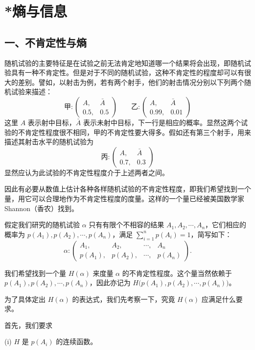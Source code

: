 \documentclass[../../main.tex]{subfiles}
\begin{document}
\section{*熵与信息}\label{section:ch04-熵与信息}

\subsection*{一、不肯定性与熵}

随机试验的主要特征是在试验之前无法肯定地知道哪一个结果将会出现，即随机试验具有一种不肯定性。但是对于不同的随机试验，这种不肯定性的程度却可以有很大的差别。譬如，以射击为例，若有两个射手，他们的射击情况分别以下列两个随机试验来描述：
\[
\text{甲}:\begin{pmatrix}A,&\bar{A}\\0.5,&0.5\end{pmatrix}
\qquad
\text{乙}:\begin{pmatrix}A,&\bar{A}\\0.99,&0.01\end{pmatrix}
\]
这里 $A$ 表示射中目标，$\bar{A}$ 表示未射中目标，下一行是相应的概率。显然这两个试验的不肯定性程度很不相同，甲的不肯定性要大得多。假如还有第三个射手，用来描述其射击水平的随机试验为
\[
\text{丙}:\begin{pmatrix}A,&\bar{A}\\0.7,&0.3\end{pmatrix}
\]
显然应认为此试验的不肯定性程度介于上述两者之间。

因此有必要从数值上估计各种各样随机试验的不肯定性程度，即我们希望找到一个量，用它可以合理地作为不肯定性程度的度量。这样的一个量已经被美国数学家 Shannon（香农）找到。

假定我们研究的随机试验 $\alpha$ 只有有限个不相容的结果 $A_1,A_2,\cdots,A_n$，它们相应的概率为 $p(A_1),p(A_2),\cdots,p(A_n)$，满足 $\sum_{i=1}^n p(A_i)=1$，简写如下：
\[
\alpha:\begin{pmatrix}A_1,&A_2,&\cdots,&A_n\\p(A_1),&p(A_2),&\cdots,&p(A_n)\end{pmatrix}.
\]

我们希望找到一个量 $H(\alpha)$ 来度量 $\alpha$ 的不肯定性程度。这个量当然依赖于 $p(A_1),p(A_2),\cdots,p(A_n)$，因此亦记为 $H\bigl(p(A_1),p(A_2),\cdots,p(A_n)\bigr)$。

为了具体定出 $H(\alpha)$ 的表达式，我们先考察一下，究竟 $H(\alpha)$ 应满足什么要求。

首先，我们要求

(i) $H$ 是 $p(A_i)$ 的连续函数。
\end{document}
